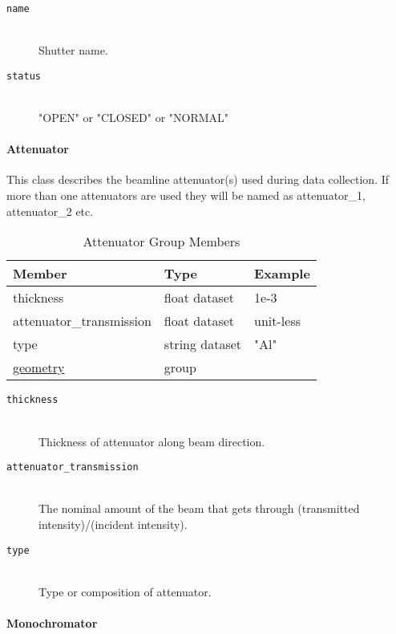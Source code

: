 \begin{description}
\item[\tt {name}] \hfill \\
{Shutter name.}

\item[\tt {status}] \hfill \\
{"OPEN" or "CLOSED" or "NORMAL"}
\end{description}

\paragraph{Attenuator}
\label{table:attenuator}

This class describes the beamline attenuator(s) used during data collection. If
more than one attenuators are used they will be named as attenuator\_1, 
attenuator\_2 etc.

\begin{table}[h!]\sffamily \footnotesize
\centering
\caption{Attenuator Group Members}
\begin{tabular}{l l l}
\toprule
\bfseries Member     & \bfseries Type & \bfseries Example \\
\midrule
thickness & float dataset & 1e-3 \\
attenuator\_transmission & float dataset & unit-less \\ 
type & string dataset & "Al" \\
\hyperref[table:geometry]{geometry} &  group & \\
\bottomrule
\end{tabular}
\end{table}

\begin{description}

\item[\tt {thickness}] \hfill \\
{Thickness of attenuator along beam direction.}

\item[\tt {attenuator\_transmission}] \hfill \\
{The nominal amount of the beam that gets through (transmitted
intensity)/(incident intensity).}

\item[\tt {type}] \hfill \\
{Type or composition of attenuator.}
\end{description}

\paragraph{Monochromator}
\label{table:monochromator}

